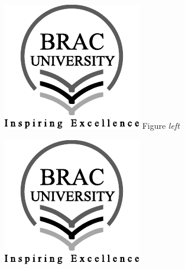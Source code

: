 \documentclass[12pt]{exam}
\begin{document}
\begin{questions}
\begin{minipage}[t]{0.3\textwidth}  %
    \centering
    \includegraphics[width=\linewidth]{bracu_logo_ai.pdf}
    \vfill
    Figure \emph{left}
\end{minipage}\hfill
\begin{minipage}[t]{0.3\textwidth}
    \centering
    \includegraphics[width=\linewidth]{bracu_logo_ai.pdf}

\end{minipage}
\end{questions}
\end{document}
